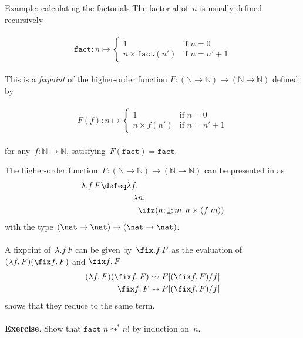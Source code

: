 \begin{frame}{Example: calculating the factorials}
  The factorial of~$n$ is usually defined recursively\\~\\
  \[
    \mathtt{fact}\colon n \mapsto
    \begin{cases}
      1 & \text{if } n = 0 \\
      n \times \mathtt{fact}(n') & \text{if } n = n' + 1
    \end{cases}
  \]
  ~\\
  This is a \emph{fixpoint} of the higher-order function
  $F\colon {(\mathbb{N}\to\mathbb{N})} \to {(\mathbb{N}\to\mathbb{N})}$ defined
  by \\~\\
  \[
    \label{eq:factorial_informal}
    F(f)\colon n \mapsto
    \begin{cases}
      1 & \text{if } n = 0 \\
      n \times f(n') & \text{if } n = n' + 1
    \end{cases}
  \]
  ~\\
  for any~$f\colon\mathbb{N}\to\mathbb{N}$, satisfying~$F(\mathtt{fact})
  =\mathtt{fact}$.
\end{frame}

\begin{frame}
  The higher-order function~$F\colon (\mathbb{N}\to\mathbb{N})
  \to(\mathbb{N}\to\mathbb{N})$ can be presented in \PCF{} as  
  \begin{align*}
    \lambda. f\, F \defeq \lambda f. & \\
    \lambda & n.\\
    & \ifz(n; \underline{1}; m.\,n\times (f\; m))
  \end{align*}
  with the type $(\nat\to\nat)\to(\nat\to\nat)$.
  \\~\\
  A fixpoint of~$\lambda. f\, F$ can be given by~$\fix. f\, F$ as the
  evaluation of~$(\lambda f.\, F)(\fix f.\, F)$ and $\fix f.\, F$ 
  \begin{align*}
    (\lambda f.\, F)(\fix f.\,F)
    & \leadsto F[(\fix f.\,F)/f] \\
    \fix f.\, F & \leadsto F[(\fix f.\, F)/ f]
  \end{align*}
  shows that they reduce to the same term. 
  \\~\\

  \textbf{Exercise}. Show that $\mathtt{fact}\;\underline{n}
  \leadsto^*\underline{n!}$ by induction on~$\underline{n}$. 
\end{frame}

